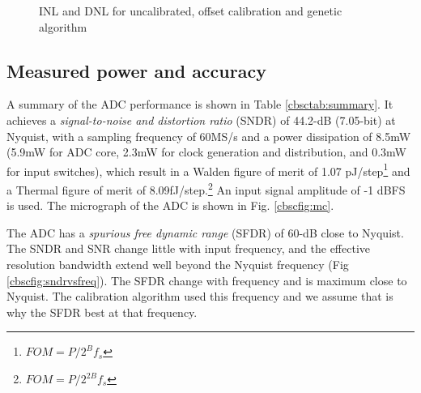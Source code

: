 \begin{figure}[htbp]
\begin{centering}
   \caption{INL and DNL for uncalibrated, offset calibration and
     genetic algorithm }
 \end{centering}
\end{figure}

\subsection{Measured power and accuracy}
A summary
of the ADC performance is shown in Table 
\ref{cbsctab:summary}. It achieves a \textit{signal-to-noise and distortion ratio} (SNDR)
of 44.2-dB (7.05-bit) at Nyquist, with a sampling frequency of
60MS/s and a power dissipation of 8.5mW (5.9mW for ADC core, 2.3mW
for clock generation and distribution, and 0.3mW for input switches), which result in a Walden figure of
merit of 1.07 pJ/step\footnote{ $FOM = P/2^B f_s$} and a Thermal
figure of merit of 8.09fJ/step.\footnote{$FOM = P/2^{2B}f_s$} An input
signal amplitude of -1 dBFS is used. The micrograph of the ADC is shown in Fig. \ref{cbscfig:mc}.

The ADC has a
\textit{spurious free dynamic range} (SFDR)  of 60-dB close to Nyquist. The SNDR and SNR change little with input
frequency, and the effective resolution bandwidth extend well beyond
the Nyquist frequency (Fig \ref{cbscfig:sndrvsfreq}). The SFDR change
with frequency and is maximum close to Nyquist. The calibration
algorithm used this frequency and we assume that is why the SFDR
best at that frequency. 

